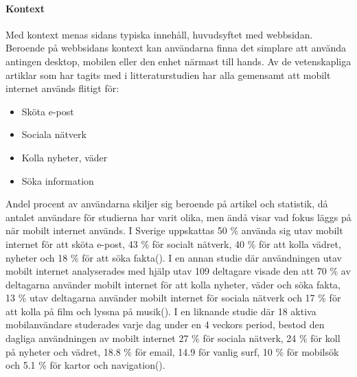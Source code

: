 \documentclass[11pt]{article}
\begin{document}
\paragraph{Kontext}\mbox{}

Med kontext menas sidans typiska innehåll, huvudsyftet med webbsidan. Beroende på webbsidans kontext kan användarna finna det simplare att använda antingen desktop, mobilen eller den enhet närmast till hands. Av de vetenskapliga artiklar som har tagits med i litteraturstudien har alla gemensamt att mobilt internet används flitigt för:

\begin{itemize}
	\item{Sköta e-post}
	\item{Sociala nätverk}
	\item{Kolla nyheter, väder}
	\item{Söka information}
\end{itemize}
\bigskip
Andel procent av användarna skiljer sig beroende på artikel och statistik, då antalet användare för studierna har varit olika, men ändå visar vad fokus läggs på när mobilt internet används. I Sverige uppskattas  50 \% använda sig utav mobilt internet för att sköta e-post, 43 \% för socialt nätverk, 40 \% för att kolla vädret, nyheter och 18 \% för att söka fakta(\cite[s. 25]{.se}). I en annan studie där användningen utav mobilt internet analyserades med hjälp utav 109 deltagare visade den att 70 \% av deltagarna använder mobilt internet för att kolla nyheter, väder och söka fakta, 13 \% utav deltagarna använder mobilt internet för sociala nätverk och 17 \% för att kolla på film och lyssna på musik(\cite{usageusability2}). I en liknande studie där 18 aktiva mobilanvändare studerades varje dag under en 4 veckors period, bestod den dagliga användningen av mobilt internet 27 \% för sociala nätverk, 24 \% för koll på nyheter och vädret, 18.8 \% för email, 14.9 för vanlig surf, 10 \% för mobilsök och 5.1 \% för kartor och navigation(\cite{mobilewebsearch}).
\end{document}
